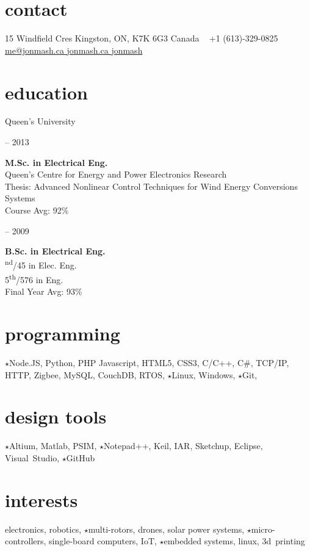 
\begin{aside}
%
\section{contact}
15 Windfield Cres
Kingston, ON, K7K 6G3
Canada
~
+1 (613)-329-0825
~
\href{mailto:me@jonmash.ca}{me@jonmash.ca \faEnvelope}
\href{http://www.jonmash.ca}{jonmash.ca \faLink}
\href{https://github.com/jonmash}{jonmash \faGithub}
%
\section{education}
\restorecr
{\headingfont Queen's University}
\begin{center}
{ -- 2013} \\
\end{center}
\textbf{M.Sc. {\normalfont in Electrical Eng.}}\\
{\bodyfontit Queen’s Centre for Energy and Power Electronics Research}\\
Thesis: Advanced Nonlinear Control Techniques for Wind Energy Conversions Systems\\
Course Avg: 92\%\\
\vspace{0.3cm}
\begin{center}
{ -- 2009} \\
\end{center}
\textbf{B.Sc. {\normalfont in Electrical Eng.}}\\
{\textsuperscript{nd}/45 in Elec. Eng. \\ 5\textsuperscript{th}/576 in Eng.}\\
Final Year Avg: 93\%\\
%
\section{programming}
{\color{orange} $\star$}Node.JS, Python, PHP
Javascript, HTML5, CSS3, C/C++, C\#,  
TCP/IP, HTTP, Zigbee, 
MySQL, CouchDB, 
RTOS, {\color{orange} $\star$}Linux, Windows,
{\color{orange} $\star$}Git,
%
\section{design tools}
{\color{orange} $\star$}Altium, Matlab, PSIM, {\color{orange} $\star$}Notepad++, Keil, IAR, Sketchup, Eclipse, Visual~Studio, {\color{orange} $\star$}GitHub
%
\section{interests}
electronics, robotics, {\color{orange} $\star$}multi-rotors, drones, solar power systems, {\color{orange} $\star$}micro-controllers, single-board computers, IoT, {\color{orange} $\star$}embedded systems, linux, 3d~printing
\obeycr
\end{aside}